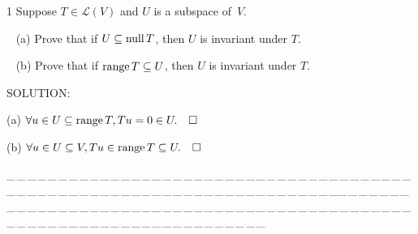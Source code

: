 \documentclass[a4paper, 11pt, UTF8]{article}
\def\range{\textup{range}\,}
\def\null{\textup{null\,}}
\def\Lm{\mathcal{L}}
\begin{document}
\begin{large}
{\timesbf\Large 1} {\timessl\Large 
Suppose $T\in\Lm(V)$ and $U$ is a subspace of \,$V$.}\par\,\,\,
(a) {\timessl\Large Prove that if $U\subseteq\null T$, then $U$ is invariant under $T$.}\par\,\,\,
(b) {\timessl\Large Prove that if $\range T\subseteq U$, then $U$ is invariant under $T$.
}\par
{\timesbf S\footnotesize{OLUTION:}}\par\quad
(a) $\forall u\in U\subseteq\range T,Tu=0\in U.\quad\square$\par\quad
(b) $\forall u\in U\subseteq V,Tu\in\range T\subseteq U.\quad\square$
\par
{\tiny \_\,\_\,\_\,\_\,\_\,\_\,\_\,\_\,\_\,\_\,\_\,\_\,\_\,\_\,\_\,\_\,\_\,\_\,\_\,\_\,\_\,\_\,\_\,\_\,\_\,\_\,\_\,\_\,\_\,\_\,\_\,\_\,\_\,\_\,\_\,\_\,\_\,\_\,\_\,\_\,\_\,\_\,\_\,\_\,\_\,\_\,\_\,\_\,\_\,\_\,\_\,\_\,\_\,\_\,\_\,\_\,\_\,\_\,\_\,\_\,\_\,\_\,\_\,\_\,\_\,\_\,\_\,\_\,\_\,\_\,\_\_\,\_\,\_\,\_\,\_\,\_\,\_\,\_\,\_\,\_\,\_\,\_\,\_\,\_\,\_\,\_\,\_\,\_\,\_\,\_\,\_\,\_\,\_\,\_\,\_\,\_\,\_\,\_\,\_\,\_\,\_\,\_\,\_\,\_\,\_\,\_\,\_\,\_\,\_\,\_\,\_\,\_\,\_\,\_\,\_\,\_\,\_\,\_\,\_\,\_\,\_\,\_\,\_\,\_\,\_\,\_\,\_\,\_\,\_\,\_\,\_\,\_\,\_\,\_\,\_\,\_\,\_\,\_\,\_\,\_\,\_}\par


\end{large}
\end{document}
